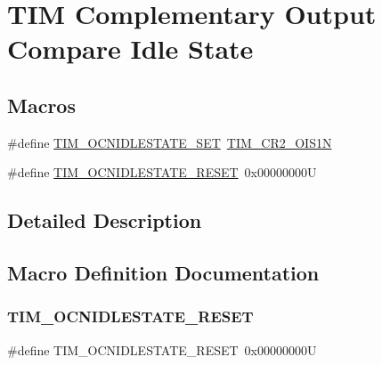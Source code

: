 \hypertarget{group___t_i_m___output___compare___n___idle___state}{}\section{T\+IM Complementary Output Compare Idle State}
\label{group___t_i_m___output___compare___n___idle___state}
\subsection*{Macros}
\begin{DoxyCompactItemize}
\item 
\#define \mbox{\hyperlink{group___t_i_m___output___compare___n___idle___state_ga1f781774c71822b2502633dfc849c5ea}{T\+I\+M\+\_\+\+O\+C\+N\+I\+D\+L\+E\+S\+T\+A\+T\+E\+\_\+\+S\+ET}}~\mbox{\hyperlink{group___peripheral___registers___bits___definition_gae61f8d54923999fffb6db381e81f2b69}{T\+I\+M\+\_\+\+C\+R2\+\_\+\+O\+I\+S1N}}
\item 
\#define \mbox{\hyperlink{group___t_i_m___output___compare___n___idle___state_ga7586655652e3c3f1cb4af1ed59d25901}{T\+I\+M\+\_\+\+O\+C\+N\+I\+D\+L\+E\+S\+T\+A\+T\+E\+\_\+\+R\+E\+S\+ET}}~0x00000000U
\end{DoxyCompactItemize}


\subsection{Detailed Description}


\subsection{Macro Definition Documentation}
\mbox{\label{group___t_i_m___output___compare___n___idle___state_ga7586655652e3c3f1cb4af1ed59d25901}} 
\subsubsection{\texorpdfstring{TIM\_OCNIDLESTATE\_RESET}{TIM\_OCNIDLESTATE\_RESET}}
{\footnotesize\ttfamily \#define T\+I\+M\+\_\+\+O\+C\+N\+I\+D\+L\+E\+S\+T\+A\+T\+E\+\_\+\+R\+E\+S\+ET~0x00000000U}

